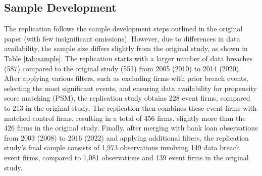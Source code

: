 \documentclass[11pt]{article}
\begin{document}
\subsection{Sample Development}
The replication follows the sample development steps outlined in the original paper (with few insignificant omissions). However, due to differences in data availability, the sample size differs slightly from the original study, as shown in Table \ref{tab:sample}. The replication starts with a larger number of data breaches (587) compared to the original study (551) from 2005 (2010) to 2014 (2020). After applying various filters, such as excluding firms with prior breach events, selecting the most significant events, and ensuring data availability for propensity score matching (PSM), the replication study obtains 228 event firms, compared to 213 in the original study. The replication then combines these event firms with matched control firms, resulting in a total of 456 firms, slightly more than the 426 firms in the original study. Finally, after merging with bank loan observations from 2003 (2008) to 2016 (2022) and applying additional filters, the replication study's final sample consists of 1,973 observations involving 149 data breach event firms, compared to 1,081 observations and 139 event firms in the original study.
\end{document}
